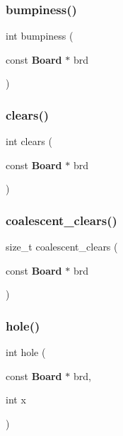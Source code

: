 \mbox{\label{tools_8h_aa5a5f3a20ab3b8a9894c2826b02f5a70}} 
\subsubsection{bumpiness()}
{\footnotesize\ttfamily int bumpiness (\begin{DoxyParamCaption}\item[{const \textbf{ Board} $\ast$}]{brd }\end{DoxyParamCaption})}

\mbox{\label{tools_8h_a60fe37bb659ce363f8e7dc89e221bc3a}} 
\subsubsection{clears()}
{\footnotesize\ttfamily int clears (\begin{DoxyParamCaption}\item[{const \textbf{ Board} $\ast$}]{brd }\end{DoxyParamCaption})}

\mbox{\label{tools_8h_a4f369174d8380130c922624d42c86714}} 
\subsubsection{coalescent\+\_\+clears()}
{\footnotesize\ttfamily size\+\_\+t coalescent\+\_\+clears (\begin{DoxyParamCaption}\item[{const \textbf{ Board} $\ast$}]{brd }\end{DoxyParamCaption})}

\mbox{\label{tools_8h_aa78f4d6d22d659aad248e39e379361db}} 
\subsubsection{hole()}
{\footnotesize\ttfamily int hole (\begin{DoxyParamCaption}\item[{const \textbf{ Board} $\ast$}]{brd,  }\item[{int}]{x }\end{DoxyParamCaption})}

